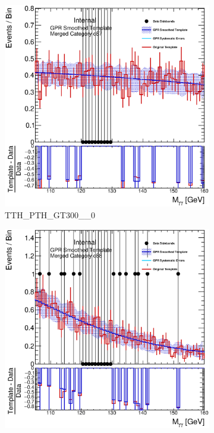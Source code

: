 \begin{figure}
\begin{center}
\begin{subfigure}[T]{0.49\linewidth}
	\includegraphics[width=\linewidth]{figures/background/gpr/coupCatTemplates/GPR_Smoothed_Plot_hmgg_c87.eps}
	\caption{TTH\_PTH\_GT300\_\_0}
\end{subfigure}
\begin{subfigure}[T]{0.49\linewidth}
	\centering
	\includegraphics[width=\linewidth]{figures/background/gpr/coupCatTemplates/GPR_Smoothed_Plot_hmgg_c88.eps}

\end{subfigure}
\end{center}
\end{figure}
